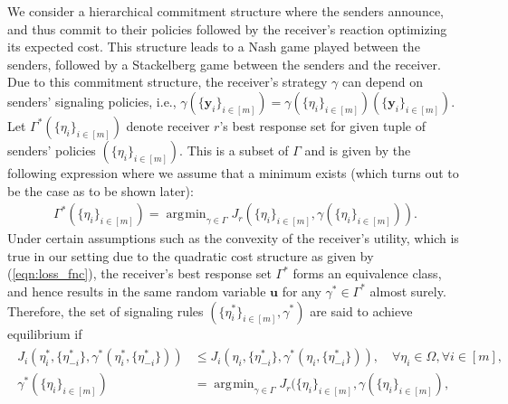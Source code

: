 \documentclass[12pt,journal,onecolumn]{IEEEtran}
\DeclareMathOperator*{\argmin}{\arg\!\min}
\begin{document}
We consider a hierarchical commitment structure where the senders announce, and thus commit to their policies followed by the receiver's reaction optimizing its expected cost. This structure leads to a Nash game played between the senders, followed by a Stackelberg game between the senders and the receiver\cite{bacsar1998dynamic}. Due to this commitment structure, the receiver's strategy $\gamma$ can depend on senders' signaling policies, i.e., $\gamma(\{\boldsymbol{y}_i\}_{i\in[m]})=\gamma(\{\eta_i\}_{i\in[m]})(\{\boldsymbol{y}_i\}_{i\in[m]})$. Let $\Gamma^*(\{\eta_i\}_{i\in[m]})$ denote receiver $r$'s best response set for given tuple of senders' policies $(\{\eta_i\}_{i\in[m]})$. This is a subset of $\Gamma$ and is given by the following expression where we assume that a minimum exists (which turns out to be the case as to be shown later):
\begin{align*}
    \Gamma^*(\{\eta_i\}_{i\in[m]})=\argmin_{\gamma \in \Gamma}  J_{r}( \{\eta_i\}_{i\in[m]}, \gamma(\{\eta_i\}_{i\in[m]})).
\end{align*}
Under certain assumptions such as the convexity of the receiver's utility, which is true in our setting due to the quadratic cost structure as given by (\ref{eqn:loss_fnc}), the receiver's best response set $\Gamma^*$ forms an equivalence class, and hence results in the same random variable $\boldsymbol{u}$ for any $\gamma^*\in\Gamma^*$ almost surely. Therefore, the set of signaling rules $(\{\eta^*_i\}_{i\in[m]},\gamma^*)$ are said to achieve equilibrium if
\begin{align}\label{eq: Nash}\begin{split}
    J_{i}(\eta_i^*,\{\eta_{-i}^*\},\gamma^*(\eta_i^*,\{\eta_{-i}^*\}))
    &\leq J_{i}(\eta_i,\{\eta_{-i}^*\},\gamma^*(\eta_i,\{\eta_{-i}^*\})), \quad\forall\eta_{i}\in\Omega,\forall i\in[m],\\
    \gamma^*(\{\eta_i\}_{i\in[m]}) &= \argmin_{\gamma \in \Gamma}  J_{r}( \{\eta_i\}_{i\in[m]}, \gamma(\{\eta_i\}_{i\in[m]}),
    \end{split}
\end{align}
\end{document}
